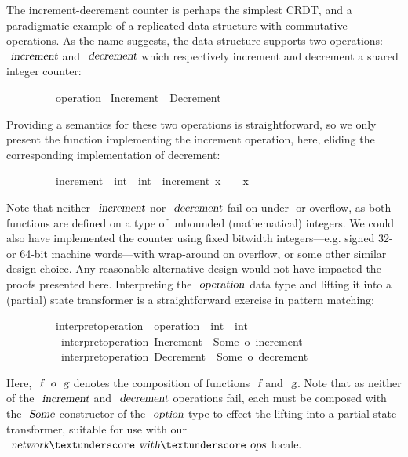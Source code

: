 The increment-decrement counter is perhaps the simplest CRDT, and a paradigmatic example of a replicated data structure with commutative operations.
As the name suggests, the data structure supports two operations: $\isa{increment}$ and $\isa{decrement}$ which respectively increment and decrement a shared integer counter:
\vspace{0.375em}
\begin{isabellebody}
\ \ \ \ \ \ \ \ \ operation {\isacharequal}\ Increment\ {\isacharbar}\ Decrement
\end{isabellebody}
\vspace{0.375em}
Providing a semantics for these two operations is straightforward, so we only present the function implementing the increment operation, here, eliding the corresponding implementation of decrement:
\vspace{0.375em}
\begin{isabellebody}
\ \ \ \ \ \ \ \ \ increment\ {\isacharcolon}{\isacharcolon}\ {\isachardoublequoteopen}int\ {\isasymRightarrow}\ int{\isachardoublequoteclose}\ \ {\isachardoublequoteopen}increment\ x\ {\isasymequiv}\ {}\ {\isacharplus}\ x{\isachardoublequoteclose}
\end{isabellebody}
\vspace{0.375em}
Note that neither $\isa{increment}$ nor $\isa{decrement}$ fail on under- or overflow, as both functions are defined on a type of unbounded (mathematical) integers.
We could also have implemented the counter using fixed bitwidth integers---e.g. signed 32- or 64-bit machine words---with wrap-around on overflow, or some other similar design choice.
Any reasonable alternative design would not have impacted the proofs presented here.
Interpreting the $\isa{operation}$ data type and lifting it into a (partial) state transformer is a straightforward exercise in pattern matching:
\vspace{0.375em}
\begin{isabellebody}
\ \ \ \ \ \ \ \ \ interpret{\isacharunderscore}operation\ {\isacharcolon}{\isacharcolon}\ {\isachardoublequoteopen}operation\ {\isasymRightarrow}\ int\ {\isasymrightharpoonup}\ int{\isachardoublequoteclose}\ \isanewline
\ \ \ \ \ \ \ \ \ \ {\isachardoublequoteopen}interpret{\isacharunderscore}operation\ Increment\ {\isacharequal}\ Some\ o\ increment{\isachardoublequoteclose}\ {\isacharbar}\isanewline
\ \ \ \ \ \ \ \ \ \ {\isachardoublequoteopen}interpret{\isacharunderscore}operation\ Decrement\ {\isacharequal}\ Some\ o\ decrement{\isachardoublequoteclose}
\end{isabellebody}
\vspace{0.375em}
Here, $\isa{f}\ \isa{o}\ \isa{g}$ denotes the composition of functions $\isa{f}$ and $\isa{g}$.
Note that as neither of the $\isa{increment}$ and $\isa{decrement}$ operations fail, each must be composed with the $\isa{Some}$ constructor of the $\isa{option}$ type to effect the lifting into a partial state transformer, suitable for use with our $\isa{network}{\isacharunderscore}\isa{with}{\isacharunderscore}\isa{ops}$ locale.

